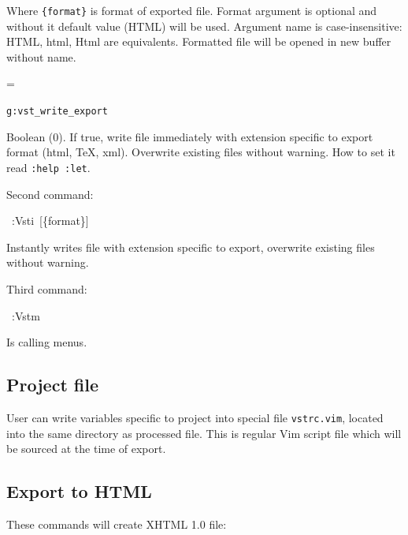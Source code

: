 \documentclass[12pt]{article}
\newenvironment{deflist}[1]{%
\begin{list}{}
{\renewcommand{\makelabel}[1]{\textbf{##1}\hfill}
\settowidth{\labelwidth}{\textbf{#1}}
\leftmargin=\labelwidth
\advance \leftmargin\labelsep}}
{\end{list}}
\begin{document}
Where \texttt{\{format\}} is format of exported file. Format argument is
optional and without it default value (HTML) will be used. Argument name
is case-insensitive: HTML, html, Html are equivalents. Formatted file
will be opened in new buffer without name.

\begin{deflist}{iii}

\item[\texttt{g:vst\_write\_export}]

Boolean (0). If true, write file immediately with extension specific to
export format (html, \TeX{}, xml). Overwrite existing files without warning.
How to set it read \texttt{:help :let}.
\end{deflist}

Second command:

\begin{ttfamily}\begin{flushleft}
\mbox{~:Vsti~[\{format\}]}\\
\end{flushleft}\end{ttfamily}

Instantly writes file with extension specific to export, overwrite existing
files without warning.

Third command:

\begin{ttfamily}\begin{flushleft}
\mbox{~:Vstm}\\
\end{flushleft}\end{ttfamily}

Is calling menus.

\hypertarget{lproject-file}{}
\subsection{Project file}

User can write variables specific to project into special file \texttt{vstrc.vim},
located into the same directory as processed file. This is regular Vim script
file which will be sourced at the time of export.

\hypertarget{lexport-to-html}{}
\subsection{Export to HTML}

These commands will create XHTML 1.0 file:
\end{document}
